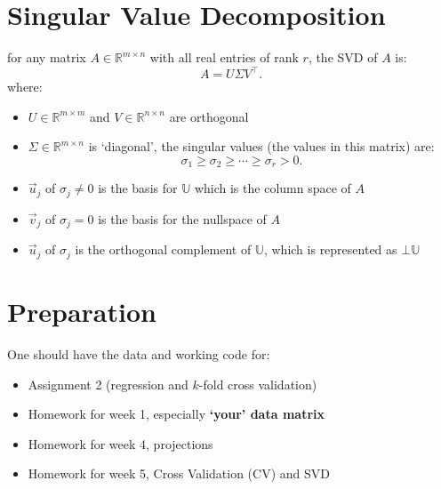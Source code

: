 \documentclass[12pt]{book}
\begin{document}
\section*{Singular Value Decomposition}
for any matrix $A\in\mathbb{R}^{m\times n}$ with all real entries of rank  $r$, the SVD of $A$ is:
 \[
A = U\Sigma V^\top
.\] 
where:
\begin{itemize}
        \item $U\in\mathbb{R}^{m\times m}$ and $V\in\mathbb{R}^{n\times n}$ are orthogonal
        \item $\Sigma\in\mathbb{R}^{m\times n}$ is `diagonal', the singular values (the values in this matrix) are:
                \[
                \sigma_1 \geq \sigma_2 \geq \cdots \geq \sigma_r > 0
                .\] 
        \item $\vec u_j$ of  $\sigma_j\neq 0$ is the basis for  $\mathbb{U}$ which is the column space of  $A$
        \item  $\vec v_j$ of  $\sigma_j = 0$ is the basis for the nullspace of  $A$ 
        \item $\vec u_j$ of  $\sigma_j$ is the orthogonal complement of $\mathbb{U}$, which is represented as  $\bot\mathbb{U}$
\end{itemize}

\section*{Preparation}
One should have the data and working code for:
\begin{itemize}
        \item Assignment 2 (regression and $k$-fold cross validation)
        \item Homework for week 1, especially \textbf{`your' data matrix}
        \item Homework for week 4, projections
        \item Homework for week 5, Cross Validation (CV) and SVD
\end{itemize}
\end{document}
